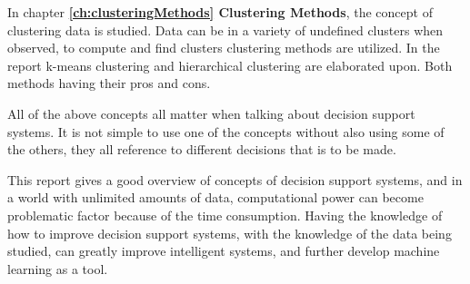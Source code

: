 In chapter \textbf{\ref{ch:clusteringMethods} Clustering Methods}, the concept of clustering data is studied. Data can be in a variety of undefined clusters when observed, to compute and find clusters clustering methods are utilized. In the report k-means clustering and hierarchical clustering are elaborated upon. Both methods having their pros and cons.

All of the above concepts all matter when talking about decision support systems. It is not simple to use one of the concepts without also using some of the others, they all reference to different decisions that is to be made.

This report gives a good overview of concepts of decision support systems, and in a world with unlimited amounts of data, computational power can become problematic factor because of the time consumption. Having the knowledge of how to improve decision support systems, with the knowledge of the data being studied, can greatly improve intelligent systems, and further develop machine learning as a tool.







